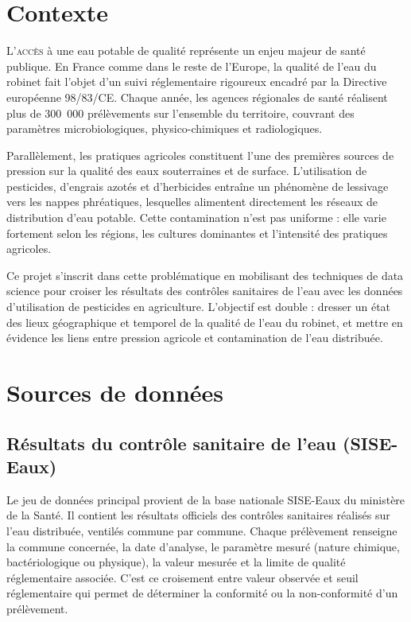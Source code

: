 \documentclass[a4paper,11pt]{article}
\begin{document}
\section{Contexte}

\lettrine[lines=2, findent=2pt, nindent=4pt]{\color{utblue}L}{'accès} à une eau potable de qualité représente un enjeu majeur de santé publique. En France comme dans le reste de l'Europe, la qualité de l'eau du robinet fait l'objet d'un suivi réglementaire rigoureux encadré par la Directive européenne 98/83/CE. Chaque année, les agences régionales de santé réalisent plus de 300~000 prélèvements sur l'ensemble du territoire, couvrant des paramètres microbiologiques, physico-chimiques et radiologiques.

Parallèlement, les pratiques agricoles constituent l'une des premières sources de pression sur la qualité des eaux souterraines et de surface. L'utilisation de pesticides, d'engrais azotés et d'herbicides entraîne un phénomène de lessivage vers les nappes phréatiques, lesquelles alimentent directement les réseaux de distribution d'eau potable. Cette contamination n'est pas uniforme : elle varie fortement selon les régions, les cultures dominantes et l'intensité des pratiques agricoles.

Ce projet s'inscrit dans cette problématique en mobilisant des techniques de data science pour croiser les résultats des contrôles sanitaires de l'eau avec les données d'utilisation de pesticides en agriculture. L'objectif est double : dresser un état des lieux géographique et temporel de la qualité de l'eau du robinet, et mettre en évidence les liens entre pression agricole et contamination de l'eau distribuée.

\section{Sources de données}

\subsection{Résultats du contrôle sanitaire de l'eau (SISE-Eaux)}

Le jeu de données principal provient de la base nationale SISE-Eaux du ministère de la Santé. Il contient les résultats officiels des contrôles sanitaires réalisés sur l'eau distribuée, ventilés commune par commune. Chaque prélèvement renseigne la commune concernée, la date d'analyse, le paramètre mesuré (nature chimique, bactériologique ou physique), la valeur mesurée et la limite de qualité réglementaire associée. C'est ce croisement entre valeur observée et seuil réglementaire qui permet de déterminer la conformité ou la non-conformité d'un prélèvement.
\end{document}
